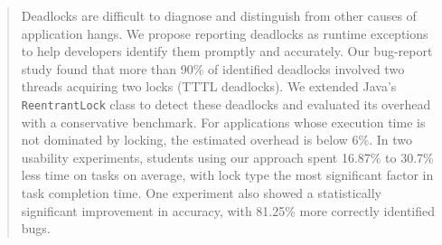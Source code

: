 \begin{abstract}
Deadlocks are difficult to diagnose and distinguish from other causes of application hangs.
We propose reporting deadlocks as runtime exceptions to help developers identify them promptly and accurately.
Our bug-report study found that more than 90\% of identified deadlocks involved two threads acquiring two locks (TTTL deadlocks).
We extended Java's {\tt ReentrantLock} class to detect these deadlocks and evaluated its overhead with a conservative benchmark.
For applications whose execution time is not dominated by locking, the estimated overhead is below 6\%.
In two usability experiments, students using our approach spent 16.87\% to 30.7\% less time on tasks on average, with lock type the most significant factor in task completion time.
One experiment also showed a statistically significant improvement in accuracy, with 81.25\% more correctly identified bugs.

\end{abstract}